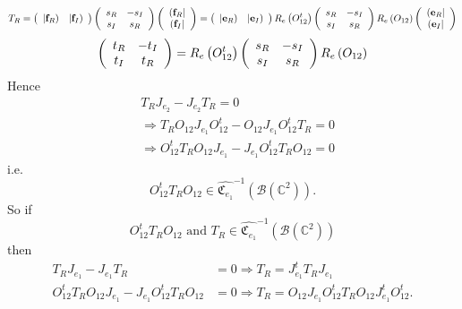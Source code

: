 \documentclass[aps,preprint]{revtex4}%
\begin{document}
\begin{equation}
T_{R}=\left(
\begin{array}
[c]{cc}%
\left\vert \mathbf{f}_{R}\right)  & \left\vert \mathbf{f}_{I}\right)
\end{array}
\right)  \left(
\begin{array}
[c]{cc}%
s_{R} & -s_{I}\\
s_{I} & s_{R}%
\end{array}
\right)  \left(
\begin{array}
[c]{c}%
\left(  \mathbf{f}_{R}\right\vert \\
\left(  \mathbf{f}_{I}\right\vert
\end{array}
\right)  =\left(
\begin{array}
[c]{cc}%
\left\vert \mathbf{e}_{R}\right)  & \left\vert \mathbf{e}_{I}\right)
\end{array}
\right)  R_{e}\left(  O_{12}^{t}\right)  \left(
\begin{array}
[c]{cc}%
s_{R} & -s_{I}\\
s_{I} & s_{R}%
\end{array}
\right)  R_{e}\left(  O_{12}\right)  \left(
\begin{array}
[c]{c}%
\left(  \mathbf{e}_{R}\right\vert \\
\left(  \mathbf{e}_{I}\right\vert
\end{array}
\right)
\end{equation}%
\begin{equation}
\left(
\begin{array}
[c]{cc}%
t_{R} & -t_{I}\\
t_{I} & t_{R}%
\end{array}
\right)  =R_{e}\left(  O_{12}^{t}\right)  \left(
\begin{array}
[c]{cc}%
s_{R} & -s_{I}\\
s_{I} & s_{R}%
\end{array}
\right)  R_{e}\left(  O_{12}\right)
\end{equation}
Hence
\begin{align}
&  T_{R}J_{e_{2}}-J_{e_{2}}T_{R}=0\\
&  \Rightarrow T_{R}O_{12}J_{e_{1}}O_{12}^{t}-O_{12}J_{e_{1}}O_{12}^{t}%
T_{R}=0\\
&  \Rightarrow O_{12}^{t}T_{R}O_{12}J_{e_{1}}-J_{e_{1}}O_{12}^{t}T_{R}O_{12}=0
\end{align}
i.e.%
\begin{equation}
O_{12}^{t}T_{R}O_{12}\in\widehat{\mathfrak{C}_{e_{1}}}^{-1}\left(
\mathcal{B}\left(  \mathbb{C}^{2}\right)  \right)  .
\end{equation}
So if
\begin{equation}
O_{12}^{t}T_{R}O_{12}\text{ and }T_{R}\in\widehat{\mathfrak{C}_{e_{1}}}%
^{-1}\left(  \mathcal{B}\left(  \mathbb{C}^{2}\right)  \right)
\end{equation}
then
\begin{align}
T_{R}J_{e_{1}}-J_{e_{1}}T_{R}  &  =0\Rightarrow T_{R}=J_{e_{1}}^{t}%
T_{R}J_{e_{1}}\\
O_{12}^{t}T_{R}O_{12}J_{e_{1}}-J_{e_{1}}O_{12}^{t}T_{R}O_{12}  &
=0\Rightarrow T_{R}=O_{12}J_{e_{1}}O_{12}^{t}T_{R}O_{12}J_{e_{1}}^{t}%
O_{12}^{t}.
\end{align}
\end{document}
